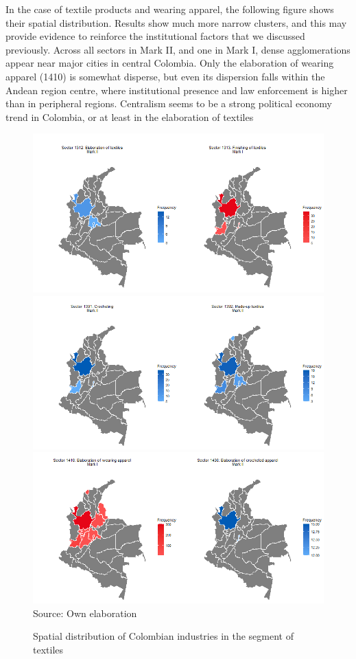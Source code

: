 \documentclass[12pt,a4paper]{article}
\begin{document}
In the case of textile products and wearing apparel, the following figure shows their spatial distribution. Results show much more narrow clusters, and this may provide evidence to reinforce the institutional factors that we discussed previously. Across all sectors in Mark II, and one in Mark I, dense agglomerations appear near major cities in central Colombia. Only the elaboration of wearing apparel (1410) is somewhat disperse, but even its dispersion falls within the Andean region centre, where institutional presence and law enforcement is higher than in peripheral regions. Centralism seems to be a strong political economy trend in Colombia, or at least in the elaboration of textiles

\begin{figure}
	\caption{Spatial distribution of Colombian industries in the segment of textiles}
	\centering
	\includegraphics[scale=0.6]{et1} \\
	\includegraphics[scale=0.6]{et2} 
	\includegraphics[scale=0.6]{et3} \\
	Source: Own elaboration
\end{figure}
\end{document}
